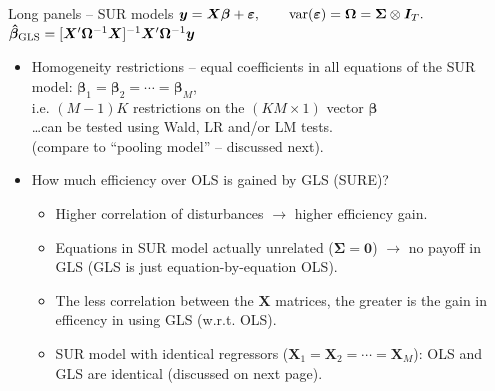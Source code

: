 \documentclass[usenames,dvipsnames]{beamer}
\begin{document}
\begin{frame}{Long panels -- SUR models}
\small
$\bm{y} = \bm{X} \bm{\beta} + \bm{\varepsilon}, \qquad \textnormal{var}(\bm{\varepsilon}) = \bm{\Omega} = \bm{\Sigma} \otimes \bm{I}_T.$ \\ \medskip
$\bm{\hat{\beta}}_{\textnormal{GLS}} = [\bm{X}^{\prime} \bm{\Omega}^{-1} \bm{X}]^{-1} \bm{X}^{\prime} \bm{\Omega}^{-1} \bm{y}$\\ \bigskip
    \begin{itemize}
    \item Homogeneity restrictions -- equal coefficients in all equations of the SUR model: $\bm{\beta}_1=\bm{\beta}_2=\cdots=\bm{\beta}_M$, \\ \smallskip i.e. $(M-1)K$ restrictions on the $(KM\times 1)$ vector $\bm{\beta}$ \\ \dots can be tested using Wald, LR and/or LM tests.\\(compare to ``pooling model'' -- discussed next).
    \bigskip
    \item How much efficiency over OLS is gained by GLS (SURE)?
    \begin{itemize}
        \item Higher correlation of disturbances $\rightarrow$ higher efficiency gain.
        \item Equations in SUR model actually unrelated ($\bm{\Sigma}=\bm{0}$) $\rightarrow$ no payoff in GLS (GLS is just equation-by-equation OLS).
        \medskip
        \item The less correlation between the $\bm{X}$ matrices, the greater is the gain in efficency in using GLS (w.r.t. OLS). 
        \item SUR model with identical regressors ($\bm{X}_1=\bm{X}_2=\cdots=\bm{X}_M$): OLS and GLS are identical (discussed on next page).
    \end{itemize}
\end{itemize}
\end{frame}
\end{document}
